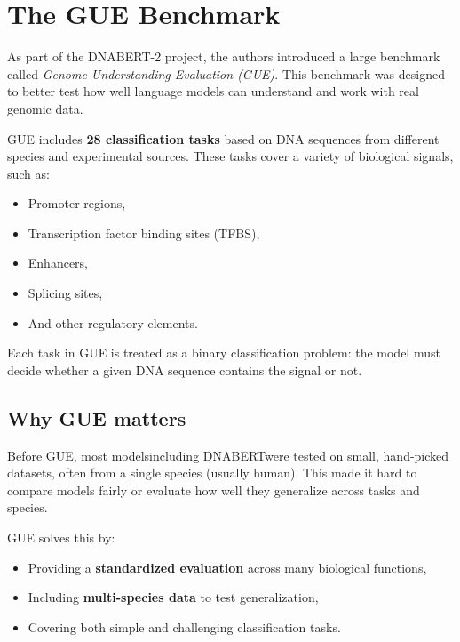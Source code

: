 \section{The GUE Benchmark}


As part of the DNABERT-2 project, the authors introduced a large benchmark called \textit{Genome Understanding Evaluation (GUE)}. This benchmark was designed to better test how well language models can understand and work with real genomic data.

GUE includes \textbf{28 classification tasks} based on DNA sequences from different species and experimental sources. These tasks cover a variety of biological signals, such as:
\begin{itemize}
\item Promoter regions,
\item Transcription factor binding sites (TFBS),
\item Enhancers,
\item Splicing sites,
\item And other regulatory elements.
\end{itemize}

Each task in GUE is treated as a binary classification problem: the model must decide whether a given DNA sequence contains the signal or not.

\subsection{Why GUE matters}

Before GUE, most models\textemdash including DNABERT\textemdash were tested on small, hand-picked datasets, often from a single species (usually human). This made it hard to compare models fairly or evaluate how well they generalize across tasks and species.

GUE solves this by:
\begin{itemize}
\item Providing a \textbf{standardized evaluation} across many biological functions,
\item Including \textbf{multi-species data} to test generalization,
\item Covering both simple and challenging classification tasks.
\end{itemize}

